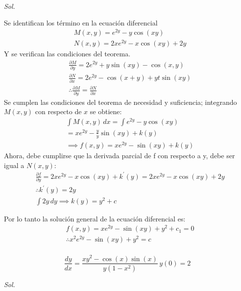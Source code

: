 \textit{ Sol. }

Se identifican los término en la ecuación diferencial 
\begin{align*}
    &M(x,y)=e^{2y}-y\cos{(xy)}\\
    &N(x,y)=2xe^{2y}-x\cos{(xy)}+2y	
\end{align*}
Y se verifican las condiciones del teorema.
\begin{align*}
    &\frac{\partial M}{\partial y}=2e^{2y}+y\sin{(xy)}-\cos{(x,y)}\\
    &\frac{\partial N}{\partial x}=2e^{2y}-\cos{(x+y)}+yt\sin{(xy)}\\
    &\therefore \frac{\partial M}{\partial y}=\frac{\partial N}{\partial x}
\end{align*}
Se cumplen las condiciones del teorema de necesidad y suficiencia; integrando $M(x,y)$ con respecto de $x$ se obtiene:
\begin{align*}
    &\int M(x,y)\, dx=\int e^{2y}-y\cos{(xy)}\\
    &=xe^{2y}-\frac{y}{y}\sin{(xy)}+k(y)\\
    &\implies f(x,y)=xe^{2y}-\sin{(xy)}+k(y)
\end{align*}
Ahora, debe cumplirse que la derivada parcial de f con respecto a y, debe ser igual a $N(x,y)$:
\begin{align*}
    &\frac{\partial f}{\partial y}=2xe^{2y}-x\cos{(xy)}+k^{\prime}(y)=2xe^{2y}-x\cos{(xy)}+2y \\
    &\therefore k^{\prime}(y)=2y\\
    &\int 2y\, dy\implies k(y)=y^2+c
\end{align*}

Por lo tanto la solución general de la ecuación diferencial es:
\begin{align*}
    &f(x,y)=xe^{2y}-\sin{(xy)}+y^2+c_1=0\\
    &\therefore x^2e^{2y}-\sin{(xy)}+y^2=c\\
\end{align*}

\begin{example}
    \begin{equation*}
        \frac{dy}{dx}=\frac{xy^2-\cos{(x)}\sin{(x)}}{y\left(1-x^2\right)}\, y(0)=2
    \end{equation*}
\end{example}

\textit{ Sol. }

